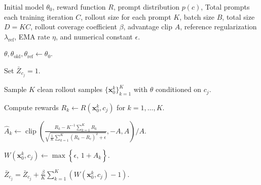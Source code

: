 

\begin{algorithm}[H]
\caption{Reinforced Flow Matching}
\label{alg:velocity-add-delete}
\begin{algorithmic}[1]
\Require Initial model $\theta_0$, reward function $R$, prompt distribution
$p(c)$, Total prompts each training iteration $C$, rollout size for each prompt $K$, batch size $B$, total size $D = KC$, 
rollout coverage coefficient $\beta$, advantage clip $A$, reference regularization
$\lambda_{\mathrm{ref}}$, EMA rate $\eta$, and numerical constant $\epsilon$.

\State $\theta,\theta_{\mathrm{old}},\theta_{\mathrm{ref}}
\leftarrow\theta_0$.

            
        \State Set $\bar{Z}_{c_j} = 1.$
        
        \State Sample $K$ clean rollout samples
        $\{\mathbf{x}_0^k\}_{k=1}^{K}$
        with $\theta$ conditioned on $c_j$.

        \State Compute rewards
        $R_k\leftarrow R(\mathbf{x}_0^k,c_j)$
        for $k=1,\ldots,K$.

            \State $\widehat{A}_k
            \leftarrow
            \operatorname{clip}
            \left(
            \frac{R_k-K^{-1}\sum_{k=1}^{K}R_k}{\sqrt{
        \frac{1}{K}\sum_{k=1}^{K}
        (R_k-\overline{R}_c)^2+\epsilon
        }},
            -A,A
            \right)/A$.
        
            \State $W(\mathbf{x}_0^k,c_j)
            \leftarrow
            \max\left\{\epsilon,\,1+\widehat{A}_k\right\}$.

            \State $\displaystyle
            \bar{Z}_{c_j}
            = \bar{Z}_{c_j} + 
            \frac{\beta}{K}
            \sum_{k=1}^{K}
            \left(
            W(\mathbf{x}_0^k,c_j)-1
            \right)$.
        
        \EndFor




    \EndFor


\end{algorithmic}
\end{algorithm}
